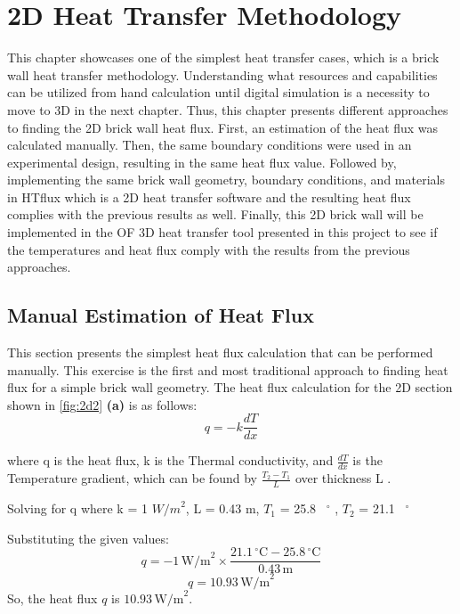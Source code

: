
\chapter{2D Heat Transfer Methodology}

This chapter showcases one of the simplest heat transfer cases, which is a brick wall heat transfer methodology.
Understanding what resources and capabilities can be utilized from hand calculation until digital simulation is a necessity to move to 3D in the next chapter. Thus, this chapter presents different approaches to finding the 2D brick wall heat flux. First, an estimation of the heat flux was calculated manually. Then, the same boundary conditions were used in an experimental design, resulting in the same heat flux value. Followed by, implementing the same brick wall geometry, boundary conditions, and materials in HTflux which is a 2D heat transfer software and the resulting heat flux complies with the previous results as well. %
Finally, this 2D brick wall will be implemented in the \gls{OF} 3D heat transfer tool presented in this project to see if the temperatures and heat flux comply with the results from the previous approaches. 




\section{Manual Estimation of Heat Flux}
This section presents the simplest heat flux calculation that can be performed manually. This exercise is the first and most traditional approach to finding heat flux for a simple brick wall geometry. The heat flux calculation for the 2D section shown in \ref{fig:2d2} \textbf{(a)} is as follows:
\begin{equation}
q = -k \frac{dT}{dx}
\end{equation}

where q is the heat flux,
k is the Thermal conductivity, and
$\frac{dT}{dx}$ is the Temperature gradient, which can be found by $\frac{T_2 - T_1}{L}$ over thickness L \cite{heattransfund}. 

Solving for q where k = 1 ${W/m}^2$, 
L = 0.43 m,
$T_1$ = 25.8 \, $^\circ$ , 
$T_2$  = 21.1 \, $^\circ$ 



Substituting the given values:
\[ q = -1 \, \text{W/m}^2 \times \frac{21.1 \, ^\circ \text{C} - 25.8 \, ^\circ \text{C}}{0.43 \, \text{m}} \]
\[ q = 10.93 \, \text{W/m}^2 \]
So, the heat flux \( q \) is \( 10.93 \, \text{W/m}^2 \).





